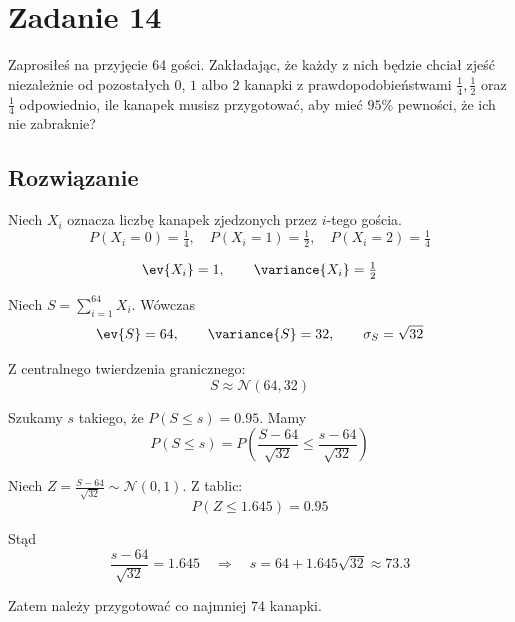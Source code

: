 \section{Zadanie 14}

Zaprosiłeś na przyjęcie 64 gości. Zakładając, że każdy z nich będzie chciał zjeść niezależnie od pozostałych \(0\), \(1\) albo \(2\) kanapki z prawdopodobieństwami \(\frac{1}{4}, \frac{1}{2}\) oraz \(\frac{1}{4}\) odpowiednio, ile kanapek musisz przygotować, aby mieć \(95\%\) pewności, że ich nie zabraknie?

\subsection*{Rozwiązanie}

Niech \(X_i\) oznacza liczbę kanapek zjedzonych przez \(i\)-tego gościa.
\[
	P(X_i=0)=\tfrac14,\quad P(X_i=1)=\tfrac12,\quad P(X_i=2)=\tfrac14
\]

\[
	\ev{X_i}=1,\qquad \variance{X_i}=\tfrac12
\]

Niech \(S=\sum_{i=1}^{64} X_i\). Wówczas
\[
	\ev{S}=64,\qquad \variance{S}=32,\qquad \sigma_S=\sqrt{32}
\]

Z centralnego twierdzenia granicznego:
\[
	S \approx \mathcal N(64,32)
\]

Szukamy \(s\) takiego, że \(P(S\le s)=0.95\). Mamy
\[
	P(S\le s)=P\!\left(\frac{S-64}{\sqrt{32}}\le \frac{s-64}{\sqrt{32}}\right)
\]

Niech \(Z=\frac{S-64}{\sqrt{32}}\sim\mathcal N(0,1)\). Z tablic:
\[
	P(Z\le 1.645)=0.95
\]

Stąd
\[
	\frac{s-64}{\sqrt{32}}=1.645
	\quad\Rightarrow\quad
	s=64+1.645\sqrt{32}\approx 73.3
\]

Zatem należy przygotować co najmniej \(\boxed{74}\) kanapki.

